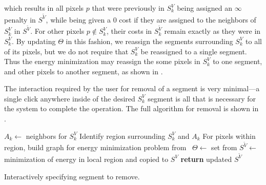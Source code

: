 \documentclass[]{spie}  %
\begin{document}

which results in all pixels $p$ that were previously in $S^V_k$ being
assigned an $\infty$ penalty in $S^{\tilde{V}}$, while being given a $0$
cost if they are assigned to the neighbors of $S^V_k$ in
$S^{\tilde{V}}$.  For other pixels $p\notin S^V_k$, their costs in
$S^{\tilde{V}}_k$ remain exactly as they were in $S^V_k$.  By updating
$\Theta$ in this fashion, we reassign the segments surrounding $S^V_k$
to all of its pixels, but we do not require that $S^V_k$ be reassigned
to a single segment.  Thus the energy minimization may reassign the
some pixels in $S^V_k$ to one segment, and other pixels to another
segment, as shown in .

The interaction required by the user for removal of a segment is very
minimal---a single click anywhere inside of the desired $S^V_k$
segment is all that is necessary for the system to complete the
operation.  The full algorithm for removal is shown in .

\begin{algorithm}[!t]
  \centering
  \algrenewcommand{}
  \begin{algorithmic}[1]
    \State $A_k \gets$ neighbors for $S^V_k$
    \State Identify region surrounding $S^V_k$ and $A_k$
    \State For pixels within region, build graph for energy minimization problem from~\cite{waggoner:11}
    \State $\Theta \gets $ set from 
    \State $ S^{\tilde{V}} \gets $ minimization of energy in local region and copied to $S^V$
    \State \textbf{return} updated $S^{\tilde{V}}$
    \EndFunction
  \end{algorithmic}
  \caption{Interactively specifying segment to remove.}
  \label{alg:remove}
\end{algorithm}
\end{document}

